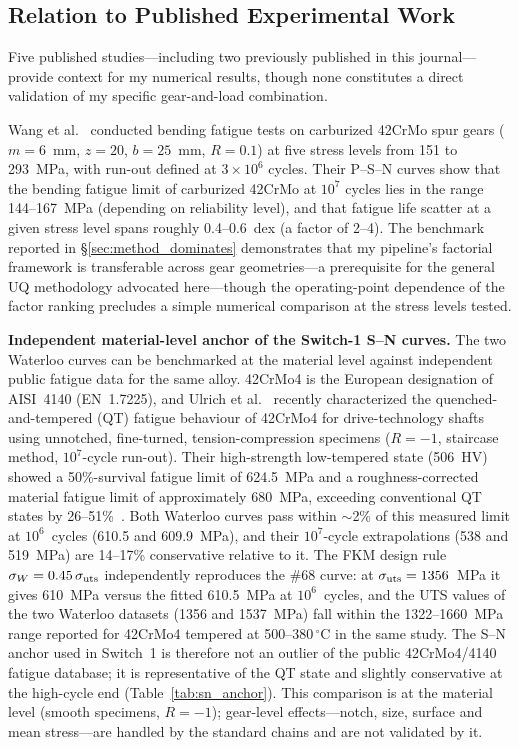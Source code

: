 \documentclass[twocolumn,12pt,a4paper]{article}
\begin{document}
\subsection{Relation to Published Experimental Work}
\label{sec:published}

Five published studies---including two previously published in
this journal---provide context for my numerical results, though
none constitutes a direct validation of my specific
gear-and-load combination.

Wang et al.~\cite{wang2023} conducted bending fatigue tests on
carburized 42CrMo spur gears ($m{=}6$~mm, $z{=}20$, $b{=}25$~mm,
$R{=}0.1$) at five stress levels from 151 to 293~MPa, with run-out
defined at $3\times10^6$ cycles. Their P--S--N curves show that the
bending fatigue limit of carburized 42CrMo at $10^7$ cycles lies in the
range 144--167~MPa (depending on reliability level), and that fatigue
life scatter at a given stress level spans roughly 0.4--0.6~dex (a
factor of 2--4). The
benchmark reported in \S\ref{sec:method_dominates} demonstrates that
my pipeline's factorial framework is transferable across gear geometries---a
prerequisite for the general UQ methodology advocated here---though the
operating-point dependence of the factor ranking precludes a simple
numerical comparison at the stress levels tested.

\textbf{Independent material-level anchor of the Switch-1 S--N curves.}
The two Waterloo curves can be benchmarked at the material level
against independent public fatigue data for the same alloy.
42CrMo4 is the European designation of AISI~4140 (EN~1.7225), and
Ulrich et al.~\cite{ulrich2025} recently characterized the
quenched-and-tempered (QT) fatigue behaviour of 42CrMo4 for
drive-technology shafts using unnotched, fine-turned,
tension-compression specimens ($R=-1$, staircase method,
$10^7$-cycle run-out). Their high-strength low-tempered state
(506~HV) showed a 50\%-survival fatigue limit of 624.5~MPa and a
roughness-corrected material fatigue limit of approximately 680~MPa,
exceeding conventional QT states by 26--51\%~\cite{ulrich2025}. Both
Waterloo curves pass within $\sim$2\% of this measured limit at
$10^6$~cycles (610.5 and 609.9~MPa), and their $10^7$-cycle
extrapolations (538 and 519~MPa) are 14--17\% conservative relative
to it. The FKM design rule $\sigma_W = 0.45\,\sigma_{\rm uts}$
independently reproduces the \#68 curve: at
$\sigma_{\rm uts}=1356$~MPa it gives 610~MPa versus the fitted
610.5~MPa at $10^6$~cycles, and the UTS values of the two Waterloo
datasets (1356 and 1537~MPa) fall within the 1322--1660~MPa range
reported for 42CrMo4 tempered at 500--380\,$^\circ$C in the same
study. The S--N anchor used in Switch~1 is therefore not an outlier
of the public 42CrMo4/4140 fatigue database; it is representative of
the QT state and slightly conservative at the high-cycle end
(Table~\ref{tab:sn_anchor}). This comparison is at the material
level (smooth specimens, $R=-1$); gear-level effects---notch, size,
surface and mean stress---are handled by the standard chains and are
not validated by it.
\end{document}
